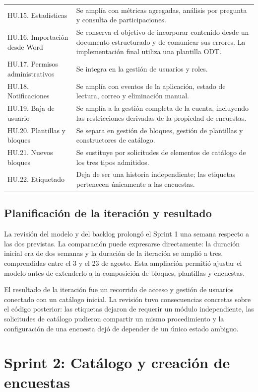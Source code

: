 \documentclass[11pt,a4paper]{report}
\begin{document}
\begin{longtable}{p{}p{}}
HU.15. Estadísticas & Se amplía con métricas agregadas, análisis por pregunta y consulta de participaciones. \\
HU.16. Importación desde Word & Se conserva el objetivo de incorporar contenido desde un documento estructurado y de comunicar sus errores. La implementación final utiliza una plantilla ODT. \\
HU.17. Permisos administrativos & Se integra en la gestión de usuarios y roles. \\
HU.18. Notificaciones & Se amplía con eventos de la aplicación, estado de lectura, correo y eliminación manual. \\
HU.19. Baja de usuario & Se amplía a la gestión completa de la cuenta, incluyendo las restricciones derivadas de la propiedad de encuestas. \\
HU.20. Plantillas y bloques & Se separa en gestión de bloques, gestión de plantillas y constructores de catálogo. \\
HU.21. Nuevos bloques & Se sustituye por solicitudes de elementos de catálogo de los tres tipos admitidos. \\
HU.22. Etiquetado & Deja de ser una historia independiente; las etiquetas pertenecen únicamente a las encuestas. \\
\end{longtable}

\subsection{Planificación de la iteración y resultado}

La revisión del modelo y del backlog prolongó el Sprint 1 una semana respecto a las dos previstas. La comparación puede expresarse directamente: la duración inicial era de dos semanas y la duración de la iteración se amplió a tres, comprendidas entre el 3 y el 23 de agosto. Esta ampliación permitió ajustar el modelo antes de extenderlo a la composición de bloques, plantillas y encuestas.

El resultado de la iteración fue un recorrido de acceso y gestión de usuarios conectado con un catálogo inicial. La revisión tuvo consecuencias concretas sobre el código posterior: las etiquetas dejaron de requerir un módulo independiente, las solicitudes de catálogo pudieron compartir un mismo procedimiento y la configuración de una encuesta dejó de depender de un único estado ambiguo.

\section{Sprint 2: Catálogo y creación de encuestas}
\end{document}
